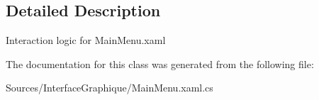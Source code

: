 \subsection{Detailed Description}
Interaction logic for Main\+Menu.\+xaml 



The documentation for this class was generated from the following file\+:\begin{DoxyCompactItemize}
\item 
Sources/\+Interface\+Graphique/Main\+Menu.\+xaml.\+cs\end{DoxyCompactItemize}

